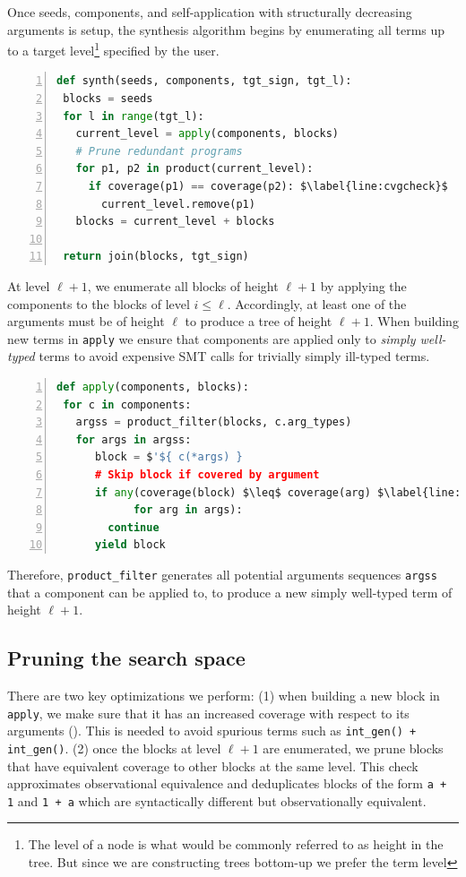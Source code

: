 \documentclass[review, sigplan]{acmart}
\begin{document}
Once seeds, components, and self-application with structurally decreasing
arguments is setup, the synthesis algorithm begins by enumerating
all terms up to a target level\footnote{The level of a node is what would
    be commonly referred to as height in the tree. But since
    we are constructing trees bottom-up we prefer the term level} specified by the user.
\begin{lstlisting}[language=Python, basicstyle=\small\ttfamily, mathescape, numbers=left, numbersep=3pt]
def synth(seeds, components, tgt_sign, tgt_l):
 blocks = seeds
 for l in range(tgt_l):
   current_level = apply(components, blocks)
   # Prune redundant programs
   for p1, p2 in product(current_level):
     if coverage(p1) == coverage(p2): $\label{line:cvgcheck}$
       current_level.remove(p1)
   blocks = current_level + blocks

 return join(blocks, tgt_sign)
\end{lstlisting}
At level $\ell + 1$, we enumerate all blocks of height $\ell + 1$ by applying
the components to the blocks of level $i \leq \ell$.
Accordingly, at least one of the arguments must be of height $\ell$ to produce
a tree of height $\ell + 1$.
When building new terms in \lstinline[basicstyle=\small\ttfamily]|apply|
we ensure that components are applied only to \emph{simply well-typed} terms
to avoid expensive SMT calls for trivially simply ill-typed terms.

\begin{lstlisting}[language=Python, basicstyle=\small\ttfamily, mathescape, numbers=left, numbersep=3pt]
def apply(components, blocks):
 for c in components:
   argss = product_filter(blocks, c.arg_types)
   for args in argss:
      block = $'${ c(*args) }
      # Skip block if covered by argument
      if any(coverage(block) $\leq$ coverage(arg) $\label{line:cvginc}$
            for arg in args):
        continue
      yield block
\end{lstlisting}

Therefore, \lstinline[basicstyle=\small\ttfamily]|product_filter|
generates all potential arguments sequences \lstinline[basicstyle=\small\ttfamily]|argss|
that a component can be applied to, to produce a new simply well-typed
term of height $\ell + 1$.

\subsection{Pruning the search space}
There are two key optimizations we perform:
(1) when building a new block in \lstinline[basicstyle=\small\ttfamily]|apply|,
we make sure that it has an increased coverage with respect to its arguments ().
This is needed to avoid spurious terms such as
\lstinline[basicstyle=\small\ttfamily]|int_gen() + int_gen()|.
(2) once the blocks at level $\ell + 1$ are enumerated,
we prune blocks that have equivalent coverage to other blocks at the same
level.
This check approximates observational equivalence and deduplicates
blocks of the form \lstinline[basicstyle=\small\ttfamily]|a + 1|
and \lstinline[basicstyle=\small\ttfamily]|1 + a| which are
syntactically different but observationally equivalent.
\end{document}
